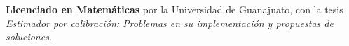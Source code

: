 \documentclass[]{friggeri-cv}
\begin{document}
\begin{entrylist}
{\begin{tabular}{l}
	\end{tabular}
    }
    {\vspace{-1.49cm}}
    { }
    {\textbf{Licenciado en Matemáticas} por la Universidad de Guanajuato, con la tesis \textsl{Estimador por calibración: Problemas en su implementación y propuestas de soluciones}.}
    \end{entrylist}
\vspace{-0.55cm}
\end{document}
